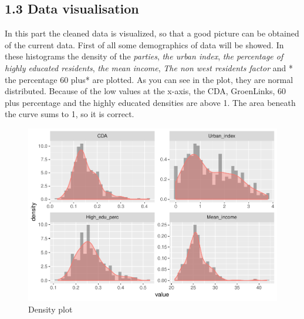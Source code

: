\documentclass[11pt,]{article}
\newenvironment{Shaded}{\begin{snugshade}}{\end{snugshade}}
\newcommand{\KeywordTok}[1]{\textcolor[rgb]{0.13,0.29,0.53}{\textbf{#1}}}
\newcommand{\DecValTok}[1]{\textcolor[rgb]{0.00,0.00,0.81}{#1}}
\newcommand{\FloatTok}[1]{\textcolor[rgb]{0.00,0.00,0.81}{#1}}
\newcommand{\StringTok}[1]{\textcolor[rgb]{0.31,0.60,0.02}{#1}}
\newcommand{\OperatorTok}[1]{\textcolor[rgb]{0.81,0.36,0.00}{\textbf{#1}}}
\newcommand{\NormalTok}[1]{#1}
\begin{document}
\begin{Shaded}
\end{Shaded}

\subsection{1.3 Data visualisation}\label{data-visualisation}

In this part the cleaned data is visualized, so that a good picture can
be obtained of the current data. First of all some demographics of data
will be showed. In these histograms the density of the \emph{parties},
\emph{the urban index}, \emph{the percentage of highly educated
residents}, \emph{the mean income}, \emph{The non west residents factor}
and * the percentage 60 plus* are plotted. As you can see in the plot,
they are normal distributed. Because of the low values at the x-axis,
the CDA, GroenLinks, 60 plus percentage and the highly educated
densities are above 1. The area beneath the curve sums to 1, so it is
correct.

\begin{figure}

{\centering \includegraphics{Report_files/figure-latex/demographics_data-1} 

}

\caption{Density plot}\label{fig:demographics_data}
\end{figure}
\end{document}
